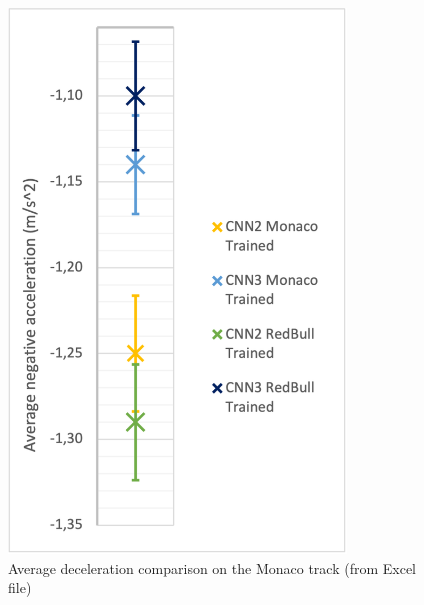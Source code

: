 \begin{figure}
\begin{minipage}{0.45\textwidth}
        \includegraphics[width=0.8\textwidth]{Figures/H3_decel.png}
        \caption{Average deceleration comparison on the Monaco track (from Excel file)}
        \label{h3_decel}
    \end{minipage}
\end{figure}



